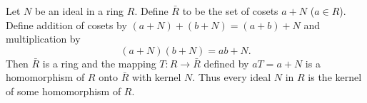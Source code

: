 Let $N$ be an ideal in a ring $R$. Define $\bar{R}$ to be the set of cosets $a + N$ ($a \in R$). Define addition of cosets by $(a+N) + (b+N) = (a+b)+N$ and multiplication by
$$(a + N)(b + N) = ab + N.$$
Then $\bar{R}$ is a ring and the mapping $T: R \to \bar{R}$ defined by $aT = a + N$ is a homomorphism of $R$ onto $\bar{R}$ with kernel $N$. Thus every ideal $N$ in $R$ is the kernel of some homomorphism of $R$.
